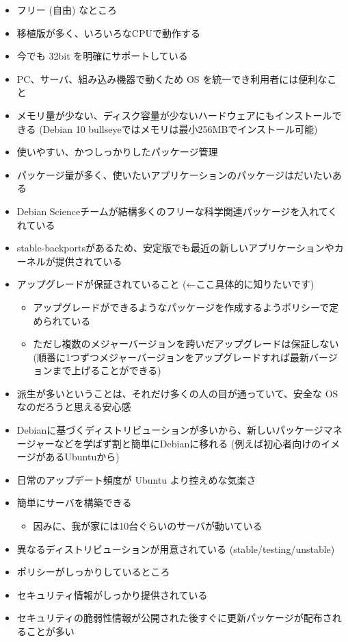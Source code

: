 \documentclass[mingoth,a4paper]{jsarticle}
\begin{document}
\begin{itemize}
\item フリー (自由) なところ
\item 移植版が多く、いろいろなCPUで動作する
\item 今でも 32bit を明確にサポートしている
\item PC、サーバ、組み込み機器で動くため OS を統一でき利用者には便利なこと
\item メモリ量が少ない、ディスク容量が少ないハードウェアにもインストールできる (Debian 10 bullseyeではメモリは最小256MBでインストール可能)
\item 使いやすい、かつしっかりしたパッケージ管理
\item パッケージ量が多く、使いたいアプリケーションのパッケージはだいたいある
\item Debian Scienceチームが結構多くのフリーな科学関連パッケージを入れてくれている
\item stable-backportsがあるため、安定版でも最近の新しいアプリケーションやカーネルが提供されている
\item アップグレードが保証されていること (←ここ具体的に知りたいです)
  \begin{itemize}
  \item アップグレードができるようなパッケージを作成するようポリシーで定められている
  \item ただし複数のメジャーバージョンを跨いだアップグレードは保証しない (順番に1つずつメジャーバージョンをアップグレードすれば最新バージョンまで上げることができる)
  \end{itemize}
\item 派生が多いということは、それだけ多くの人の目が通っていて、安全な OS なのだろうと思える安心感
\item Debianに基づくディストリビューションが多いから、新しいパッケージマネージャーなどを学ばず割と簡単にDebianに移れる (例えば初心者向けのイメージがあるUbuntuから)
\item 日常のアップデート頻度が Ubuntu より控えめな気楽さ
\item 簡単にサーバを構築できる
  \begin{itemize}
  \item 因みに、我が家には10台ぐらいのサーバが動いている
  \end{itemize}
\item 異なるディストリビューションが用意されている (stable/testing/unstable)
\item ポリシーがしっかりしているところ
\item セキュリティ情報がしっかり提供されている
\item セキュリティの脆弱性情報が公開された後すぐに更新パッケージが配布されることが多い
\end{itemize}
\end{document}
